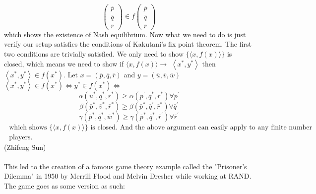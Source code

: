 \documentclass[12pt]{article}
\begin{document}
 	\[\left( \begin{array} { c } { \overline { p } } \\ { \overline { q } } \\ { \overline { r } } \end{array} \right) \in f \left( \begin{array} { c } { \overline { p } } \\ { \overline { q } } \\ { \overline { r } } \end{array} \right)\]
 	which shows the existence of Nash equilibrium. Now what we need to do is just verify our setup
 	satisfies the conditions of Kakutani's fix point theorem. The first two conditions are trivially
 	satisfied. We only need to show $\{ \langle x , f ( x ) \rangle \}$ is closed, which means we need to show if $\langle x , f ( x ) \rangle \rightarrow$ $\left\langle x ^ { * } , y ^ { * } \right\rangle$ then $\left\langle x ^ { * } , y ^ { * } \right\rangle \in f \left( x ^ { * } \right) .$ Let $x = ( \overline { p } , \overline { q } , \overline { r } )$ and $y = ( \overline { u } , \overline { v } , \overline { w } )$\\
 	$\left\langle x ^ { * } , y ^ { * } \right\rangle \in f \left( x ^ { * } \right) \Leftrightarrow y ^ { * } \in f \left( x ^ { * } \right) \Leftrightarrow$ \[\alpha \left( \overline { u } ^ { * } , \overline { q } ^ { * } , \overline { r } ^ { * } \right) \geq \alpha \left( \overline { p } ^ { \prime } , \overline { q } ^ { * } , \overline { r } ^ { * } \right) \forall \overline { p } ^ { \prime }\]
 	\[\beta \left( \overline { p } ^ { * } , \overline { v } ^ { * } , \overline { r } ^ { * } \right) \geq \beta \left( \overline { p } ^ { * } , \overline { q } ^ { \prime } , \overline { r } ^ { * } \right) \forall \overline { q } ^ { \prime }\]
 	\[	\gamma \left( \overline { p } ^ { * } , \overline { q } ^ { * } , \overline { w } ^ { * } \right) \geq \gamma \left( \overline { p } ^ { * } , \overline { q } ^ { * } , \overline { r } ^ { \prime } \right) \forall \overline { r } ^ { \prime }\]
$ 	\begin{array} { l } { \text { which shows } \{ \langle x , f ( x ) \rangle \} \text { is closed. And the above argument can easily apply to any finite number } } \\ { \text { players. } } \end{array} $\\
 	(Zhifeng Sun)\\
 	\\
 	This led to the creation of a famous game theory example called the "Prisoner's Dilemma" in 1950 by Merrill Flood and Melvin Dresher while working at RAND. The game goes as some version as such: \\
\end{document}
